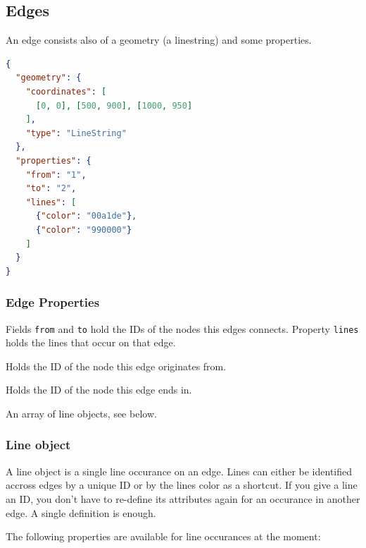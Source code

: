 \documentclass[10pt,a4paper]{article}
\begin{document}
\subsection{Edges}

An edge consists also of a geometry (a linestring) and some properties.

\begin{lstlisting}[language=json,firstnumber=1]
{
  "geometry": {
	"coordinates": [
	  [0, 0], [500, 900], [1000, 950]
	],
	"type": "LineString"
  },
  "properties": {
	"from": "1",
	"to": "2",
	"lines": [
	  {"color": "00a1de"},
	  {"color": "990000"}
	]
  }
}
\end{lstlisting}


\subsubsection{Edge Properties}

Fields \texttt{from} and \texttt{to} hold the IDs of the nodes this edges connects. Property \texttt{lines} holds the lines that occur on that edge.

\begin{description}[align=right]
  \item[\texttt{from}] Holds the ID of the node this edge originates from.
  \item[\texttt{to}] Holds the ID of the node this edge ends in.
  \item[\texttt{lines}] An array of line objects, see below.
\end{description}

\subsubsection{Line object}

A line object is a single line occurance on an edge. Lines can either be identified accross edges by a unique ID or by the lines color as a shortcut. If you give a line an ID, you don't have to re-define its attributes again for an occurance in another edge. A single definition is enough.

The following properties are available for line occurances at the moment:
\end{document}
